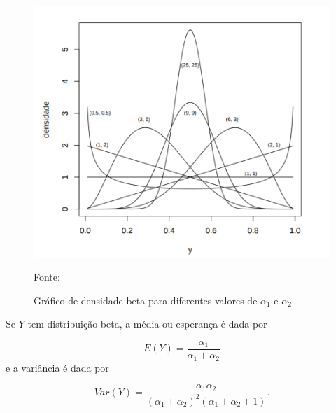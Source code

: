 \begin{figure}[!h]
	\centering
	\includegraphics[keepaspectratio=true,scale=0.3]{figuras/dist-beta1.png}
	\caption{Gráfico de densidade beta para diferentes valores de $\alpha_1$ e $\alpha_2$}
	Fonte: \cite{gomes2005}
	\label{fig06}
\end{figure}



Se $Y$ tem distribuição beta, a média ou esperança é dada por

\begin{equation}
E(Y) = \frac {\alpha_1}{\alpha_1 + \alpha_2}
\end{equation}
%
e a variância é dada por

\begin{equation}
Var(Y) = \frac{\alpha_1\alpha_2}{(\alpha_1+\alpha_2)^2(\alpha_1+\alpha_2+1)}.
\end{equation}




